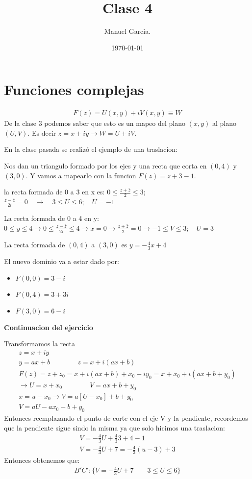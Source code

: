 \documentclass{article}
\title{Clase 4 }
\author{Manuel Garcia.}
\date{\today}
\newcommand{\caja}[3]{%
  \begin{tcolorbox}[colback=#1!5!white,colframe=#1!25!black,title=#2]
    #3
  \end{tcolorbox}%
}
\begin{document}
\maketitle

\section{Funciones complejas }
\begin{gather}
  F\left(z\right)=U\left(x,y\right)+i V\left(x,y \right)\equiv W 
  \label{eq:funcion_compleja}
\end{gather}
De la clase 3 podemos saber que esto es un mapeo del plano $ (x,y) $ al plano $ (U,V) $. Es decir $ z = x+iy  \rightarrow W = U+iV$.

En la clase pasada se realizó el ejemplo de una traslacion: 

\caja{red}{Traslacion }{
  Nos dan un triangulo formado por los ejes y una recta que corta en $ (0,4) $ y $ (3,0) $. Y vamos a mapearlo con la funcion $ F(z) = z+3-1  $. 

  la recta formada de 0 a 3 en x es: $ 0\leq \frac{z+\bar z }{2 }\leq 3   $; $ \frac{z-\bar z }{2i } = 0   \quad \rightarrow \quad 3 \leq U\leq 6; \quad U=-1$

  La recta formada de 0 a 4 en y: $ 0\leq y\leq 4 \rightarrow  0\leq \frac{z- \bar z }{2i }\leq 4    \rightarrow x=0 \rightarrow \frac{z+\bar z}{2} = 0  \rightarrow -1\leq V\leq 3;\quad  U = 3 $

  La recta formada de $ (0,4) $ a $(3,0)$ es $ y = -\frac{4}{3}x+4  $


  El nuevo dominio va a estar dado por:
  \begin{itemize}
    \item $F(0,0) = 3-i $
    \item $ F(0,4) = 3+3i $
    \item $ F(3,0) = 6-i $
  \end{itemize}
  \tcblower
  \textbf{Continuacion del ejercicio }

  Transformamos la recta
  \begin{gather}
     z = x+iy \\
     y = ax+b \qquad \qquad z = x+i(ax+b )\\
     F(z) = z +z_0 = x+i(ax+b)+x_0+i y_0 = x+x_0 + i (ax+b+y_0)\\
     \rightarrow U = x+x_0 \qquad \qquad V= ax+b+y_0 \\
     x = u-x_0 \rightarrow V = a[U-x_0]+b+y_0 \\
     V = aU-ax_0+b+y_0
  \end{gather}
  Entonces reemplazando el punto de corte con el eje V y la pendiente, recordemos que la pendiente sigue sindo la misma ya que solo hicimos una traslacion: 
  \begin{gather}
     V = -\frac{4}{3}U + \frac{4}{3}3 + 4-1 \\
     V = -\frac{4}{3}U + 7 = -\frac{4}{3}(u-3 )+3
  \end{gather}
  Entonces obtenemos que:
  \begin{gather}
    B'C': \{ V = -\frac{4}{3}U+7 \qquad 3\leq U \leq 6 \}
  \end{gather}
}
\end{document}
